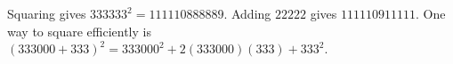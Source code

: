 Squaring gives $333333^2=111110888889$. Adding $22222$ gives $\boxed{111110911111}$. One way to square efficiently is $(333000+333)^2=333000^2+2(333000)(333)+333^2$.
